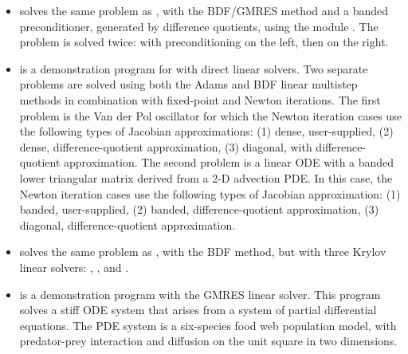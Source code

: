 \begin{itemize}
  solves the semi-discrete form of a two-species diurnal kinetics
  advection-diffusion PDE system in 2-D.
  \newline
  The problem is solved with the BDF/GMRES method (i.e.
  using the {\sunlinsolspgmr} linear solver and {\cvls} interface)
  and the block-diagonal part of the Newton matrix as a left
  preconditioner. A copy of the block-diagonal part of the Jacobian is
  saved and conditionally reused within the preconditioner setup routine.
\item {}
  solves the same problem as , with the BDF/GMRES method
  and a banded preconditioner, generated by difference quotients,
  using the module {\cvbandpre}.
  \newline
  The problem is solved twice: with preconditioning on the left,
  then on the right.
\item {}
  is a demonstration program for {\cvode} with direct linear solvers.
  \newline
  Two separate problems are solved using both the Adams and BDF linear
  multistep methods in combination with fixed-point and Newton
  iterations.
  \newline
  The first problem is the Van der Pol oscillator for which
  the Newton iteration cases use the following types of Jacobian approximations:
  (1) dense, user-supplied, (2) dense, difference-quotient approximation,
  (3) diagonal, with difference-quotient approximation. The second
  problem is a linear ODE with a
  banded lower triangular matrix derived from a 2-D advection PDE. In this
  case, the Newton iteration cases use the following types of Jacobian
  approximation: (1) banded, user-supplied, (2) banded, difference-quotient
  approximation, (3) diagonal, difference-quotient approximation.
\item {}
  solves the same problem as , with the BDF method, but with
  three Krylov linear solvers: {\sunlinsolspgmr}, {\sunlinsolspbcgs},
  and {\sunlinsolsptfqmr}.
\item {}
  is a demonstration program with the GMRES linear solver.
  \newline
  This program solves a stiff ODE system that arises from a system
  of partial differential equations.  The PDE system is a six-species
  food web population model, with predator-prey interaction and diffusion
  on the unit square in two dimensions.
  \newline

\end{itemize}
